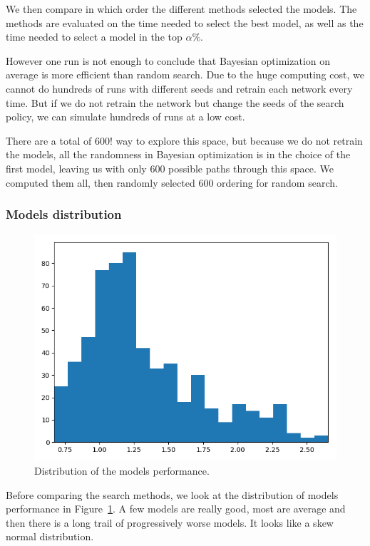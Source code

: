 We then compare in which order the different methods selected the models. The methods are evaluated on the time needed to select the best model, as well as the time needed to select a model in the top $\alpha \%$.

However one run is not enough to conclude that Bayesian optimization on average is more efficient than random search. Due to the huge computing cost, we cannot do hundreds of runs with different seeds and retrain each network every time. But if we do not retrain the network but change the seeds of the search policy, we can simulate hundreds of runs at a low cost. 

There are a total of $600!$ way to explore this space, but because we do not retrain the models, all the randomness in Bayesian optimization is in the choice of the first model, leaving us with only 600 possible paths through this space. We computed them all, then randomly selected 600 ordering for random search.

\subsubsection{Models distribution}

\begin{figure}[htb]
	\centering
	\includegraphics[width=0.7\linewidth]{img_hyperopt/cifar_hist.png}
	\caption{Distribution of the models performance.}
	\label{fig:cifar_hist}
\end{figure}

Before comparing the search methods, we look at the distribution of models performance in Figure~\ref{fig:cifar_hist}. A few models are really good, most are average and then there is a long trail of progressively worse models. It looks like a skew normal distribution. 

